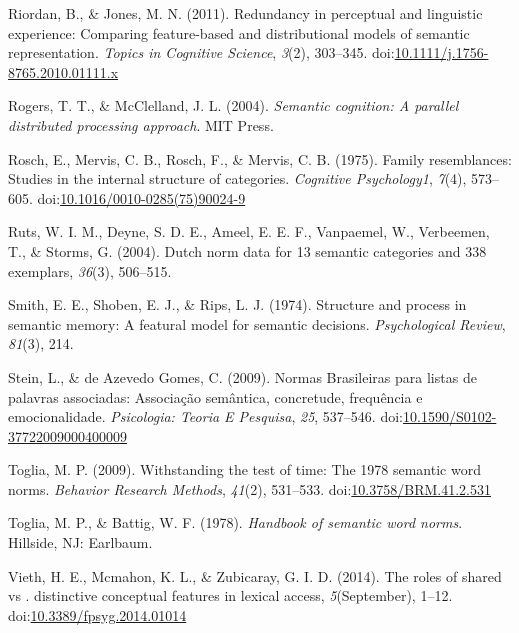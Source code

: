 \documentclass[english,man]{apa6}
\theoremstyle{definition}
\theoremstyle{definition}
\theoremstyle{definition}
\theoremstyle{remark}
\begin{document}
\hypertarget{ref-Riordan2011}{}
Riordan, B., \& Jones, M. N. (2011). Redundancy in perceptual and
linguistic experience: Comparing feature-based and distributional models
of semantic representation. \emph{Topics in Cognitive Science},
\emph{3}(2), 303--345.
doi:\href{https://doi.org/10.1111/j.1756-8765.2010.01111.x}{10.1111/j.1756-8765.2010.01111.x}

\hypertarget{ref-Rogers2004}{}
Rogers, T. T., \& McClelland, J. L. (2004). \emph{Semantic cognition: A
parallel distributed processing approach}. MIT Press.

\hypertarget{ref-Rosch1975}{}
Rosch, E., Mervis, C. B., Rosch, F., \& Mervis, C. B. (1975). Family
resemblances: Studies in the internal structure of categories.
\emph{Cognitive Psychology1}, \emph{7}(4), 573--605.
doi:\href{https://doi.org/10.1016/0010-0285(75)90024-9}{10.1016/0010-0285(75)90024-9}

\hypertarget{ref-Ruts2004}{}
Ruts, W. I. M., Deyne, S. D. E., Ameel, E. E. F., Vanpaemel, W.,
Verbeemen, T., \& Storms, G. (2004). Dutch norm data for 13 semantic
categories and 338 exemplars, \emph{36}(3), 506--515.

\hypertarget{ref-Smith1974}{}
Smith, E. E., Shoben, E. J., \& Rips, L. J. (1974). Structure and
process in semantic memory: A featural model for semantic decisions.
\emph{Psychological Review}, \emph{81}(3), 214.

\hypertarget{ref-Stein2009}{}
Stein, L., \& de Azevedo Gomes, C. (2009). Normas Brasileiras para
listas de palavras associadas: Associação semântica, concretude,
frequência e emocionalidade. \emph{Psicologia: Teoria E Pesquisa},
\emph{25}, 537--546.
doi:\href{https://doi.org/10.1590/S0102-37722009000400009}{10.1590/S0102-37722009000400009}

\hypertarget{ref-Toglia2009}{}
Toglia, M. P. (2009). Withstanding the test of time: The 1978 semantic
word norms. \emph{Behavior Research Methods}, \emph{41}(2), 531--533.
doi:\href{https://doi.org/10.3758/BRM.41.2.531}{10.3758/BRM.41.2.531}

\hypertarget{ref-Toglia1978}{}
Toglia, M. P., \& Battig, W. F. (1978). \emph{Handbook of semantic word
norms}. Hillside, NJ: Earlbaum.

\hypertarget{ref-Vieth2014}{}
Vieth, H. E., Mcmahon, K. L., \& Zubicaray, G. I. D. (2014). The roles
of shared vs . distinctive conceptual features in lexical access,
\emph{5}(September), 1--12.
doi:\href{https://doi.org/10.3389/fpsyg.2014.01014}{10.3389/fpsyg.2014.01014}
\end{document}
